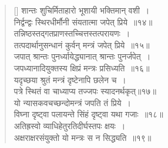 \documentclass[twoside,12pt,notitlepage]{book}
\begin{document}
\begin{verse}[\versewidth]
	शान्तः शुचिर्मिताहारो भूशायी भक्तिमान् वशी~।\\[-6pt]
	निर्द्वन्द्वः स्थिरधीर्मौनी संयतात्मा जपेत् प्रिये~॥१४॥\\
	तन्निष्ठस्तद्गतप्राणस्तच्चित्तस्तत्परायणः~।\\[-6pt]
	तत्पदार्थानुसन्धानं  कुर्वन् मन्त्रं जपेत् प्रिये~॥१५॥\\
	जपात् श्रान्तः पुनर्ध्यायेद्ध्यानात् श्रान्तः पुनर्जपेत्~।\\[-6pt]
	जपध्यानादियुक्तस्य क्षिप्रं मन्त्रः प्रसिध्यति~॥१६॥\\
	यदृच्छया श्रुतं मन्त्रं दृष्टेनापि छलेन च~।\\[-6pt]
	पत्रे स्थितं वा चाध्याप्य तज्जपः स्यादनर्थकृत्॥१७॥\\
		यो न्यासकवचच्छन्दोमन्त्रं जपति तं प्रिये~।\\[-6pt]
		विघ्ना दृष्ट्वा पलायन्ते सिंहं दृष्ट्वा यथा गजाः~॥१८॥\\
		अतिह्रस्वो व्याधिहेतुरतिदीर्घस्तपः क्षयः~।\\[-6pt]
		अक्षराक्षरसंयुक्तो यो मन्त्रः स न सिद्ध्यति~॥१९॥
\end{verse}
	
\clearpage			
\end{document}
